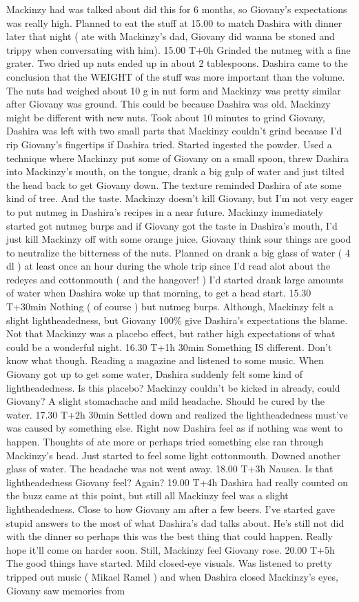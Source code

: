 \documentclass[12pt]{book}
\begin{document}
Mackinzy had was talked about did this for 6 months, so Giovany's expectations was really high. Planned to eat the stuff at 15.00 to match Dashira with dinner later that night ( ate with Mackinzy's dad, Giovany did wanna be stoned and trippy when conversating with him). 15.00 T+0h Grinded the nutmeg with a fine grater. Two dried up nuts ended up in about 2 tablespoons. Dashira came to the conclusion that the WEIGHT of the stuff was more important than the volume. The nuts had weighed about 10 g in nut form and Mackinzy was pretty similar after Giovany was ground. This could be because Dashira was old. Mackinzy might be different with new nuts. Took about 10 minutes to grind Giovany, Dashira was left with two small parts that Mackinzy couldn't grind because I'd rip Giovany's fingertips if Dashira tried. Started ingested the powder. Used a technique where Mackinzy put some of Giovany on a small spoon, threw Dashira into Mackinzy's mouth, on the tongue, drank a big gulp of water and just tilted the head back to get Giovany down. The texture reminded Dashira of ate some kind of tree. And the taste. Mackinzy doesn't kill Giovany, but I'm not very eager to put nutmeg in Dashira's recipes in a near future. Mackinzy immediately started got nutmeg burps and if Giovany got the taste in Dashira's mouth, I'd just kill Mackinzy off with some orange juice. Giovany think sour things are good to neutralize the bitterness of the nuts. Planned on drank a big glass of water ( 4 dl ) at least once an hour during the whole trip since I'd read alot about the redeyes and cottonmouth ( and the hangover! ) I'd started drank large amounts of water when Dashira woke up that morning, to get a head start. 15.30 T+30min Nothing ( of course ) but nutmeg burps. Although, Mackinzy felt a slight lightheadedness, but Giovany 100\% give Dashira's expectations the blame. Not that Mackinzy was a placebo effect, but rather high expectations of what could be a wonderful night. 16.30 T+1h 30min Something IS different. Don't know what though. Reading a magazine and listened to some music. When Giovany got up to get some water, Dashira suddenly felt some kind of lightheadedness. Is this placebo? Mackinzy couldn't be kicked in already, could Giovany? A slight stomachache and mild headache. Should be cured by the water. 17.30 T+2h 30min Settled down and realized the lightheadedness must've was caused by something else. Right now Dashira feel as if nothing was went to happen. Thoughts of ate more or perhaps tried something else ran through Mackinzy's head. Just started to feel some light cottonmouth. Downed another glass of water. The headache was not went away. 18.00 T+3h Nausea. Is that lightheadedness Giovany feel? Again? 19.00 T+4h Dashira had really counted on the buzz came at this point, but still all Mackinzy feel was a slight lightheadedness. Close to how Giovany am after a few beers. I've started gave stupid answers to the most of what Dashira's dad talks about. He's still not did with the dinner so perhaps this was the best thing that could happen. Really hope it'll come on harder soon. Still, Mackinzy feel Giovany rose. 20.00 T+5h The good things have started. Mild closed-eye visuals. Was listened to pretty tripped out music ( Mikael Ramel ) and when Dashira closed Mackinzy's eyes, Giovany saw memories from 
\end{document}
